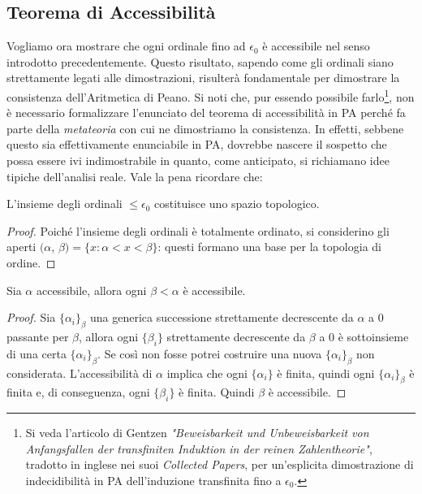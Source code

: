 	\subsection{Teorema di Accessibilità}
		Vogliamo ora mostrare che ogni ordinale fino ad $\epsilon_{0}$ è accessibile nel senso introdotto precedentemente. Questo risultato, sapendo come gli ordinali siano strettamente legati alle dimostrazioni, risulterà fondamentale per dimostrare la consistenza dell'Aritmetica di Peano.
		Si noti che, pur essendo possibile farlo\footnote{Si veda l'articolo di Gentzen \emph{"Beweisbarkeit und Unbeweisbarkeit von Anfangsfallen der transfiniten Induktion in der reinen Zahlentheorie"}, tradotto in inglese nei suoi \emph{Collected Papers}, per un'esplicita dimostrazione di indecidibilità in PA dell'induzione transfinita fino a $\epsilon_{0}$.}, non è necessario formalizzare l'enunciato del teorema di accessibilità in PA perché fa parte della \emph{metateoria} con cui ne dimostriamo la consistenza. In effetti, sebbene questo sia effettivamente enunciabile in PA, dovrebbe nascere il sospetto che possa essere ivi indimostrabile in quanto, come anticipato, si richiamano idee tipiche dell'analisi reale. Vale la pena ricordare che:
	\begin{lemma}%
		L'insieme degli ordinali $\leq \epsilon_{0}$ costituisce uno spazio topologico.
	\end{lemma}
	\begin{proof}
		Poiché l'insieme degli ordinali è totalmente ordinato, si considerino gli aperti $(\alpha$, $\beta)=\{x:\alpha<x<\beta\}$: questi formano una base per la topologia di ordine.
	\end{proof}
	\begin{lemma}
		Sia $\alpha$ accessibile, allora ogni $\beta<\alpha$ è accessibile.
	\end{lemma}	
	\begin{proof}
		Sia $\{\alpha_{i}\}_{\beta}$ una generica successione strettamente decrescente da $\alpha$ a $0$ passante per $\beta$, allora ogni $\{\beta_{i}\}$ strettamente decrescente da $\beta$ a $0$ è sottoinsieme di una certa $\{\alpha_{i}\}_{\beta}$. Se così non fosse potrei costruire una nuova $\{\alpha_{i}\}_{\beta}$ non considerata.
		L'accessibilità di $\alpha$ implica che ogni $\{\alpha_{i}\}$ è finita, quindi ogni $\{\alpha_{i}\}_{\beta}$ è finita e, di conseguenza, ogni $\{\beta_{i}\}$ è finita. Quindi $\beta$ è accessibile.
		\begin{comment}
		Sia $\{\beta_{i}\}$ una generica successione strettamente decrescente da $\beta$ a $0$. Poiché $\{\beta_{i}\}\subset\{\alpha_{i}\}$ per un'opportuna successione strettamente decrescente $\{\alpha_{i}\}$ da $\alpha$ a $0$ allora necessariamente $\{\beta_{i}\}$ è finita.
		\end{comment}
	\end{proof}
